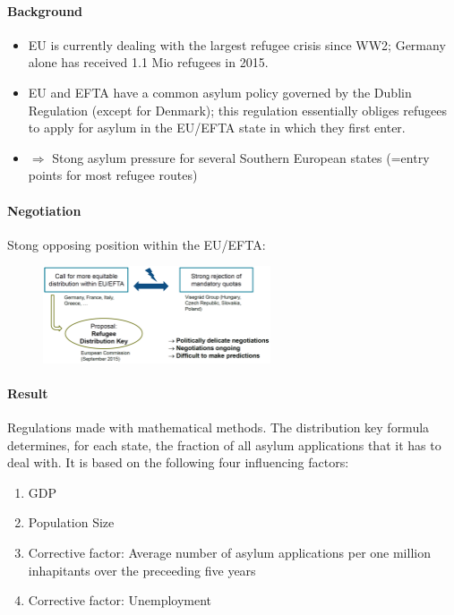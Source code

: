 \paragraph{Background}

\begin{itemize}
    \item EU is currently dealing with the largest refugee crisis since WW2;
        Germany alone has received 1.1 Mio refugees in 2015.
    \item EU and EFTA have a common asylum policy governed by the Dublin
         Regulation (except for Denmark); this regulation essentially
        obliges refugees to apply for asylum in the EU/EFTA state in which they
        first enter.
    \item $\Rightarrow$ Stong asylum pressure for several Southern European
        states (=entry points for most refugee routes)
\end{itemize}

\paragraph{Negotiation}

Stong opposing position within the EU/EFTA:

\begin{figure}[h]
    \centering
    \includegraphics[width=0.6\textwidth]{Pictures/refugees.png}
\end{figure}

\paragraph{Result}

Regulations made with mathematical methods.
The distribution key formula determines, for each state, the fraction of
all asylum applications that it has to deal with. It is based on the following
four influencing factors:
\begin{enumerate}
    \item GDP
    \item Population Size
    \item Corrective factor: Average number of asylum applications per one
        million inhapitants over the preceeding five years
    \item Corrective factor: Unemployment
\end{enumerate}

